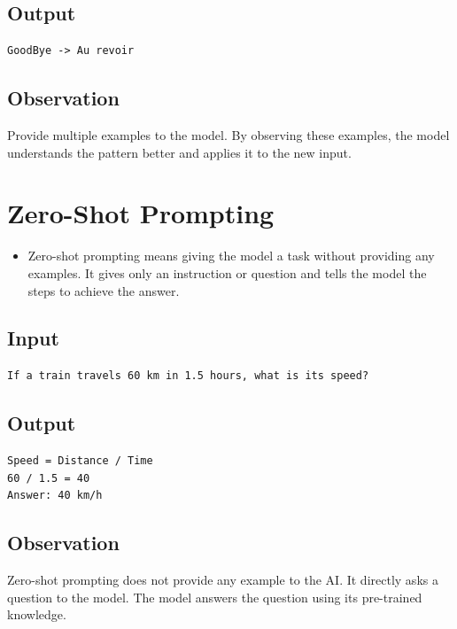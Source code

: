 \documentclass[12pt]{article}
\begin{document}
\subsection*{Output}
\begin{verbatim}
GoodBye -> Au revoir
\end{verbatim}

\subsection*{Observation}
Provide multiple examples to the model. By observing these examples, the model understands the pattern better and applies it to the new input.


\section{Zero-Shot Prompting}

\begin{itemize}
    \item Zero-shot prompting means giving the model a task without providing any examples. It gives only an instruction or question and tells the model the steps to achieve the answer.
\end{itemize}

\subsection*{Input}
\begin{verbatim}
If a train travels 60 km in 1.5 hours, what is its speed?
\end{verbatim}

\subsection*{Output}
\begin{verbatim}
Speed = Distance / Time
60 / 1.5 = 40
Answer: 40 km/h
\end{verbatim}

\subsection*{Observation}
Zero-shot prompting does not provide any example to the AI. It directly asks a question to the model. The model answers the question using its pre-trained knowledge.

\end{document}
